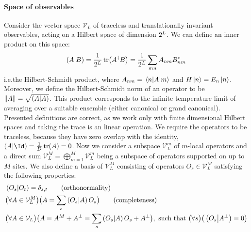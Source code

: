 \paragraph{Space of observables}Consider the vector space \(\mathcal{V}_L\) of traceless and translationally invariant
observables, acting on a Hilbert space of dimension \(2^L\). We can define an inner product on this space:
\begin{equation}
  \left(A \middle| B\right) = \frac{1}{2^L}\tr(A^{\dagger}B) = \frac{1}{2^L} \sum_{mn} A_{nm}B_{nm}^{\ast}
\end{equation}
i.e.\;the Hilbert-Schmidt product, where \(A_{nm} = \matrixel{n}{A}{m}\) and \(H\ket{n} = E_n \ket{n}\).
Moreover, we define the Hilbert-Schmidt norm of an operator to be \(\norm{A} = \sqrt{\left(A \middle| A\right)}\).
This product corresponds to the infinite temperature limit of averaging over a suitable ensemble (either
canonical or grand canonical).
Presented definitions are correct, as we work only with finite dimensional Hilbert spaces and taking the trace is an
linear operation. We require the operators to be traceless, because they have zero overlap with the identity, \(\left(A|\Id\right)=\frac{1}{D}\tr(A) = 0\).
Now we consider a subspace \(\mathcal{V}_L^m\) of \(m\)-local operators and a direct sum
\(\mathcal{V}_L^M = \bigoplus_{m = 1}^M \mathcal{V}_L^m\) being a subspace of operators supported on up to \(M\) sites.
We also define a basis of \(\mathcal{V}_L^M\) consisting of operators \(O_s\in \mathcal{V}_L^M\)
satisfying the following properties:
\begin{align}
   & \hs{O_s}{O_{t}} = \delta_{s,t} \tag{\text{orthonormality}}                                    \nonumber{}\\
   & \big(\forall A \in \mathcal{V}_L^M\big) \big(A = \sum_s \hs{O_s}{A} O_s\big) \tag{\text{completeness}}   \nonumber{}\\
   & \big(\forall A \in \mathcal{V}_L \big) \big( A = A^M + A^{\perp} = \sum_s \hs{O_s}{A} O_s + A^{\perp}\big) ,
  \text{ such that } \big(\forall s\big) \big( \hs{O_s}{A^{\perp}} = 0\big)\label{eq:basis}
\end{align}


